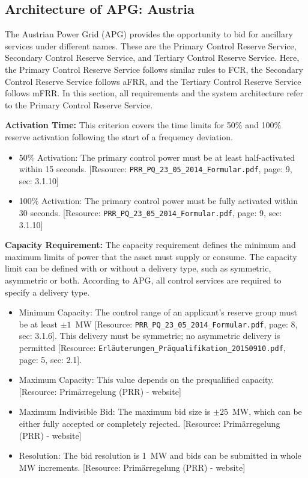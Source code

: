 \subsection{Architecture of APG: Austria}
The Austrian Power Grid (APG) provides the opportunity to bid for ancillary services under different names. These are the Primary Control Reserve Service, Secondary Control Reserve Service, and Tertiary Control Reserve Service. Here, the Primary Control Reserve Service follows similar rules to FCR, the Secondary Control Reserve Service follows aFRR, and the Tertiary Control Reserve Service follows mFRR. In this section, all requirements and the system architecture refer to the Primary Control Reserve Service.

\textbf{Activation Time:} This criterion covers the time limits for 50\% and 100\% reserve activation following the start of a frequency deviation.
\begin{itemize}
    \item 50\% Activation: The primary control power must be at least half-activated within 15 seconds. [Resource: \texttt{PRR\_PQ\_23\_05\_2014\_Formular.pdf}, page: 9, sec: 3.1.10]
    \item 100\% Activation: The primary control power must be fully activated within 30 seconds. [Resource: \texttt{PRR\_PQ\_23\_05\_2014\_Formular.pdf}, page: 9, sec: 3.1.10]
\end{itemize}
\textbf{Capacity Requirement:} The capacity requirement defines the minimum and maximum limits of power that the asset must supply or consume. The capacity limit can be defined with or without a delivery type, such as symmetric, asymmetric or both. According to APG, all control services are required to specify a delivery type.
\begin{itemize}
    \item Minimum Capacity: The control range of an applicant's reserve group must be at least $\pm 1$~MW [Resource: \texttt{PRR\_PQ\_23\_05\_2014\_Formular.pdf}, page: 8, sec: 3.1.6]. This delivery must be symmetric; no asymmetric delivery is permitted [Resource: \texttt{Erläuterungen\_Präqualifikation\_20150910.pdf}, page: 5, sec: 2.1].
    \item Maximum Capacity: This value depends on the prequalified capacity. [Resource: Primärregelung (PRR) - website]
    \item Maximum Indivisible Bid: The maximum bid size is $\pm 25$~MW, which can be either fully accepted or completely rejected. [Resource: Primärregelung (PRR) - website]
    \item Resolution: The bid resolution is 1~MW and bids can be submitted in whole MW increments. [Resource: Primärregelung (PRR) - website]
\end{itemize}
